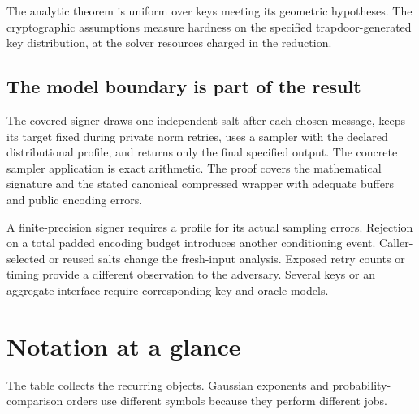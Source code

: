 \documentclass[11pt,a4paper]{article}
\theoremstyle{definition}
\theoremstyle{remark}
\numberwithin{equation}{section}
\begin{document}
The analytic theorem is uniform over keys meeting its geometric hypotheses. The cryptographic assumptions measure hardness on the specified trapdoor-generated key distribution, at the solver resources charged in the reduction.

\subsection{The model boundary is part of the result}
\label{sec:model-boundary}

The covered signer draws one independent salt after each chosen message, keeps its target fixed during private norm retries, uses a sampler with the declared distributional profile, and returns only the final specified output. The concrete sampler application is exact arithmetic. The proof covers the mathematical signature and the stated canonical compressed wrapper with adequate buffers and public encoding errors.

A finite-precision signer requires a profile for its actual sampling errors. Rejection on a total padded encoding budget introduces another conditioning event. Caller-selected or reused salts change the fresh-input analysis. Exposed retry counts or timing provide a different observation to the adversary. Several keys or an aggregate interface require corresponding key and oracle models.

\clearpage
\appendix
\section{Notation at a glance}

The table collects the recurring objects. Gaussian exponents and probability-comparison orders use different symbols because they perform different jobs.
\end{document}
